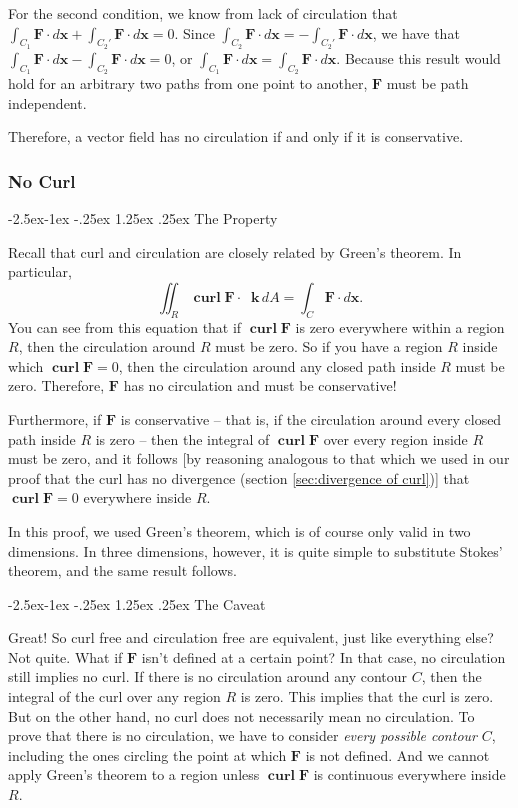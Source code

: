 \documentclass{myarticle}
\makeatletter
\newcommand\subsubsubsection{\@startsection{paragraph}{4}{\z@}%
  {-2.5ex\@plus -1ex \@minus -.25ex}%
  {1.25ex \@plus .25ex}%
  {\normalfont\normalsize\bfseries}}
\DeclareMathOperator{\curl}{\mathbf{curl}}
\renewcommand{\vec}[1]{\mathbf{#1}}
\newcommand{\unitvector}[1]{
  \mathop{}\!\vec{#1}
}
\newcommand{\kh}{\unitvector{k}}
\theoremstyle{nospace}
\newtheorem{old series theorem}{Theorem}
\newenvironment{series theorem}
{\begin{mdframed}\begin{old series theorem}}
    {\end{old series theorem}\end{mdframed}}
\makeatother
\begin{document}
For the second condition, we know from lack of circulation that
$\int_{C_1} \vec{F} \cdot d\vec{x} + \int_{C_2'} \vec{F} \cdot
d\vec{x} = 0$. Since $\int_{C_2} \vec{F} \cdot d\vec{x} = -\int_{C_2'}
\vec{F} \cdot d\vec{x}$, we have that $\int_{C_1} \vec{F} \cdot
d\vec{x} - \int_{C_2} \vec{F} \cdot d\vec{x} = 0$, or $\int_{C_1}
\vec{F} \cdot d\vec{x} = \int_{C_2} \vec{F} \cdot d\vec{x}$. Because
this result would hold for an arbitrary two paths from one point to
another, $\vec{F}$ must be path independent.


Therefore, a vector field has no circulation if and only if it is
conservative.

\subsubsection{No Curl}
\label{sec:no curl}

\subsubsubsection{The Property}
\label{sec:no curl property}

Recall that curl and circulation are closely related by Green's
theorem. In particular,
\[
  \iint_R \curl \vec{F} \cdot \kh \,dA
  = \int_C \vec{F} \cdot d\vec{x}.
\]
You can see from this equation that if $\curl \vec{F}$ is zero
everywhere within a region $R$, then the circulation around $R$ must
be zero. So if you have a region $R$ inside which $\curl \vec{F} = 0$,
then the circulation around any closed path inside $R$ must be zero.
Therefore, $\vec{F}$ has no circulation and must be conservative!

Furthermore, if $\vec{F}$ is conservative -- that is, if the
circulation around every closed path inside $R$ is zero -- then the
integral of $\curl \vec{F}$ over every region inside $R$ must be zero,
and it follows [by reasoning analogous to that which we used in our
proof that the curl has no divergence (section \ref{sec:divergence of
  curl})] that $\curl \vec{F} = 0$ everywhere inside $R$.

In this proof, we used Green's theorem, which is of course only valid
in two dimensions. In three dimensions, however, it is quite simple to
substitute Stokes' theorem, and the same result follows.

\subsubsubsection{The Caveat}
\label{sec:no curl caveat}

Great! So curl free and circulation free are equivalent, just like
everything else? Not quite. What if $\vec{F}$ isn't defined at a
certain point? In that case, no circulation still implies no curl. If
there is no circulation around any contour $C$, then the integral of
the curl over any region $R$ is zero. This implies that the curl is
zero. But on the other hand, no curl does not necessarily mean no
circulation. To prove that there is no circulation, we have to
consider \emph{every possible contour} $C$, including the ones
circling the point at which $\vec{F}$ is not defined. And we cannot
apply Green's theorem to a region unless $\curl \vec{F}$ is continuous
everywhere inside $R$.
\end{document}
